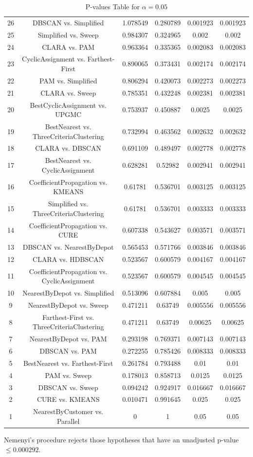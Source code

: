 \documentclass[a4paper,10pt]{article}
\begin{document}
\begin{landscape}
\begin{table}[!htp]
\begin{tabular}{cccccc}
26&DBSCAN vs. Simplified&1.078549&0.280789&0.001923&0.001923\\
25&Simplified vs. Sweep&0.984307&0.324965&0.002&0.002\\
24&CLARA vs. PAM&0.963364&0.335365&0.002083&0.002083\\
23&CyclicAssignment vs. Farthest-First&0.890065&0.373431&0.002174&0.002174\\
22&PAM vs. Simplified&0.806294&0.420073&0.002273&0.002273\\
21&CLARA vs. Sweep&0.785351&0.432248&0.002381&0.002381\\
20&BestCyclicAssignment vs. UPGMC&0.753937&0.450887&0.0025&0.0025\\
19&BestNearest vs. ThreeCriteriaClustering&0.732994&0.463562&0.002632&0.002632\\
18&CLARA vs. DBSCAN&0.691109&0.489497&0.002778&0.002778\\
17&BestNearest vs. CyclicAssignment&0.628281&0.52982&0.002941&0.002941\\
16&CoefficientPropagation vs. KMEANS&0.61781&0.536701&0.003125&0.003125\\
15&Simplified vs. ThreeCriteriaClustering&0.61781&0.536701&0.003333&0.003333\\
14&CoefficientPropagation vs. CURE&0.607338&0.543627&0.003571&0.003571\\
13&DBSCAN vs. NearestByDepot&0.565453&0.571766&0.003846&0.003846\\
12&CLARA vs. HDBSCAN&0.523567&0.600579&0.004167&0.004167\\
11&CoefficientPropagation vs. CyclicAssignment&0.523567&0.600579&0.004545&0.004545\\
10&NearestByDepot vs. Simplified&0.513096&0.607884&0.005&0.005\\
9&NearestByDepot vs. Sweep&0.471211&0.63749&0.005556&0.005556\\
8&Farthest-First vs. ThreeCriteriaClustering&0.471211&0.63749&0.00625&0.00625\\
7&NearestByDepot vs. PAM&0.293198&0.769371&0.007143&0.007143\\
6&DBSCAN vs. PAM&0.272255&0.785426&0.008333&0.008333\\
5&BestNearest vs. Farthest-First&0.261784&0.793488&0.01&0.01\\
4&PAM vs. Sweep&0.178013&0.858713&0.0125&0.0125\\
3&DBSCAN vs. Sweep&0.094242&0.924917&0.016667&0.016667\\
2&CURE vs. KMEANS&0.010471&0.991645&0.025&0.025\\
1&NearestByCustomer vs. Parallel&0&1&0.05&0.05\\
\hline
\end{tabular}
\caption{P-values Table for $\alpha=0.05$}
\end{table}Nemenyi's procedure rejects those hypotheses that have an unadjusted p-value $\le0.000292$.


\end{landscape}
\end{document}
